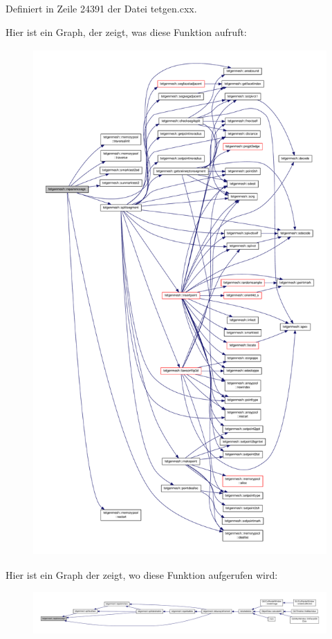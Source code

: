 Definiert in Zeile 24391 der Datei tetgen.\-cxx.



Hier ist ein Graph, der zeigt, was diese Funktion aufruft\-:\nopagebreak
\begin{figure}[H]
\begin{center}
\leavevmode
\includegraphics[height=550pt]{classtetgenmesh_a7af360f1ae413f9e0d7803ccae55b6d6_cgraph}
\end{center}
\end{figure}




Hier ist ein Graph der zeigt, wo diese Funktion aufgerufen wird\-:\nopagebreak
\begin{figure}[H]
\begin{center}
\leavevmode
\includegraphics[width=350pt]{classtetgenmesh_a7af360f1ae413f9e0d7803ccae55b6d6_icgraph}
\end{center}
\end{figure}


